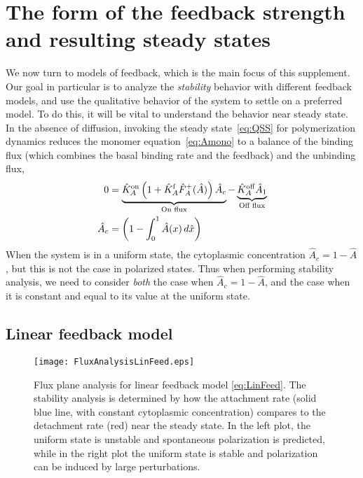 \documentclass[11pt]{article}
\newcommand{\6}[1]{#1_{\text{6}}}
\newcommand{\3}[1]{#1_{\text{3}}}
\begin{document}
\section{The form of the feedback strength and resulting steady states}
We now turn to models of feedback, which is the main focus of this supplement. Our goal in particular is to analyze the \emph{stability} behavior with different feedback models, and use the qualitative behavior of the system to settle on a preferred model. To do this, it will be vital to understand the behavior near steady state. In the absence of diffusion, invoking the steady state\ \eqref{eq:QSS} for polymerization dynamics reduces the monomer equation\ \eqref{eq:Amono} to a balance of the binding flux (which combines the basal binding rate and the feedback) and the unbinding flux,
\begin{align}
\label{eq:MonSS}
0&= \underbrace{\hat{K}^\text{on}_A \left(1+\hat{K}^\text{f}_A \hat F_A^+(\hat A) \right)\hat A_c}_\text{On flux} - \underbrace{\hat{K}^\text{off}_A  \hat A_1}_\text{Off flux}\\ \nonumber
\hat A_c &= \left(1 - \int_0^1 \hat A(x) \, d\hat{x} \right)
\end{align}
When the system is in a uniform state, the cytoplasmic concentration $\hat A_c = 1-\hat A$, but this is not the case in polarized states. Thus when performing stability analysis, we need to consider \emph{both} the case when $\hat A_c = 1-\hat A$, and the case when it is constant and equal to its value at the uniform state. 

\subsection{Linear feedback model}
\begin{figure}
\centering
\texttt{[image: FluxAnalysisLinFeed.eps]}
\caption{\label{fig:P3Linear}Flux plane analysis for linear feedback model \eqref{eq:LinFeed}. The stability analysis is determined by how the attachment rate (solid blue line, with constant cytoplasmic concentration) compares to the detachment rate (red) near the steady state. In the left plot, the uniform state is unstable and spontaneous polarization is predicted, while in the right plot the uniform state is stable and polarization can be induced by large perturbations.}
\end{figure}
\end{document}
